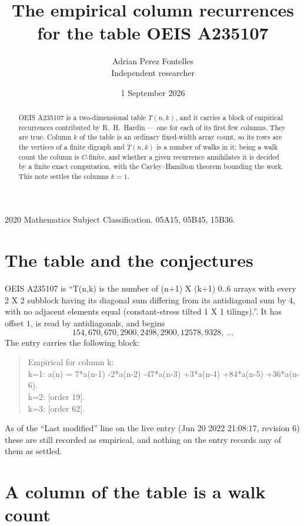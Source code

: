 \documentclass[11pt,a4paper]{article}
\title{The empirical column recurrences for the table OEIS A235107}
\author{Adrian Perez Fontelles\\ \small Independent researcher}
\date{1 September 2026}
\theoremstyle{plain}
\theoremstyle{definition}
\begin{document}
\maketitle

\begin{abstract}
OEIS A235107 is a two-dimensional table $T(n,k)$, and it carries a block of empirical
recurrences contributed by R.~H.~Hardin --- one for each of its first few columns. They are
true. Column $k$ of the table is an ordinary fixed-width array count, so its rows are the
vertices of a finite digraph and $T(n,k)$ is a number of walks in it; being a walk count the
column is $C$-finite, and whether a given recurrence annihilates it is decided by a finite
exact computation, with the Cayley--Hamilton theorem bounding the work. This note settles the
columns $k=1$.
\end{abstract}

\noindent\small 2020 Mathematics Subject Classification. 05A15, 05B45, 15B36.\normalsize

\section{The table and the conjectures}

OEIS A235107 is ``T(n,k) is the number of (n+1) X (k+1) 0..6 arrays with every 2 X 2 subblock having its diagonal sum differing from its antidiagonal sum by 4, with no adjacent elements equal (constant-stress tilted 1 X 1 tilings).''. It has offset $1$, is
read by antidiagonals, and begins
\[
154, 670, 670, 2900, 2498, 2900, 12578, 9328,\ \dots
\]
The entry carries the following block:
\begin{quote}\small
Empirical for column k:\\
k=1: a(n) = 7*a(n-1) -2*a(n-2) -47*a(n-3) +3*a(n-4) +84*a(n-5) +36*a(n-6).\\
k=2: [order 19].\\
k=3: [order 62].\\
\end{quote}
As of the ``Last modified'' line on the live entry (Jun 20 2022 21:08:17, revision 6) these are still
recorded as empirical, and nothing on the entry records any of them as settled.

\section{A column of the table is a walk count}
\end{document}
